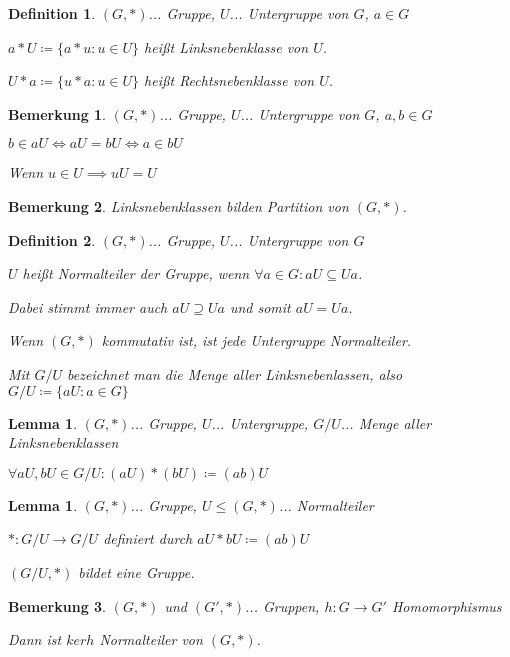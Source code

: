 \documentclass[twocolumn]{article}
\newtheorem{lemma}[theorem]{Lemma}
\newtheorem{definition}{Definition}[section]
\newtheorem*{remark}{Bemerkung}
\newcommand*{\logeq}{\Leftrightarrow}
\begin{document}
\begin{definition}
	$(G,*)$... Gruppe, $U$... Untergruppe von $G$, $a \in G$
	
	$a*U\coloneqq \{a*u:u \in U\}$ heißt Linksnebenklasse von $U$.
	
	$U*a\coloneqq \{u*a:u \in U\}$ heißt Rechtsnebenklasse von $U$.
\end{definition}

\begin{remark}
	$(G,*)$... Gruppe, $U$... Untergruppe von $G$, $a,b \in G$
	
	$b \in aU \logeq aU=bU \logeq a \in bU$
	
	Wenn $u \in U \implies uU=U$
\end{remark}

\begin{remark}
	Linksnebenklassen bilden Partition von $(G,*)$.
\end{remark}

\begin{definition}
	$(G,*)$... Gruppe, $U$... Untergruppe von $G$
	
	$U$ heißt Normalteiler der Gruppe, wenn $\forall a \in G : aU\subseteq Ua$.
	
	Dabei stimmt immer auch $aU\supseteq Ua$ und somit $aU=Ua$.
	
	Wenn $(G,*)$ kommutativ ist, ist jede Untergruppe Normalteiler.
	
	Mit $G/U$ bezeichnet man die Menge aller Linksnebenlassen, also $G/U\coloneqq\{aU:a\in G\}$
\end{definition}

\begin{lemma}
	$(G,*)$... Gruppe, $U$... Untergruppe, $G/U$... Menge aller Linksnebenklassen
	
	$\forall aU,bU \in G/U:(aU)*(bU)\coloneqq(ab)U$
\end{lemma}

\begin{lemma}
	$(G,*)$... Gruppe, $U \leq(G,*)$... Normalteiler
	
	$*:G/U\rightarrow G/U$ definiert durch $aU*bU\coloneqq (ab)U$
	
	$(G/U,*)$ bildet eine Gruppe.
\end{lemma}

\begin{remark}
	$(G,*)$ und $(G',*)$... Gruppen, $h:G\rightarrow G'$ Homomorphismus
	
	Dann ist $kerh$ Normalteiler von $(G,*)$.
\end{remark}
\end{document}

